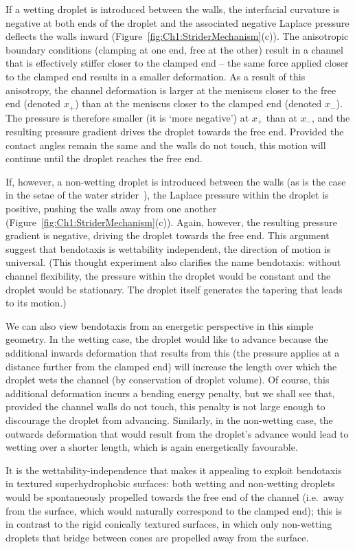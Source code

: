 If a wetting droplet is introduced between the walls, the interfacial curvature is negative at both ends of the droplet and the associated negative Laplace pressure deflects the walls inward (Figure~\ref{fig:Ch1:StriderMechanism}(c)).   The anisotropic boundary conditions (clamping at one end, free at the other) result in a channel that is effectively stiffer closer to the clamped end -- the same force applied closer to the clamped end results in a smaller deformation. As a result of this anisotropy, the channel deformation is larger at the meniscus closer to the free end (denoted $x_+$) than at the meniscus closer to the clamped end (denoted $x_-$). The pressure is therefore smaller (it is `more negative') at $x_+$ than at $x_-$, and the resulting pressure gradient drives the droplet towards the free end. Provided the contact angles remain the same and the walls do not touch, this motion will continue until the droplet reaches the free end.

If, however, a non-wetting droplet is introduced between the walls (as is the case in the setae of the water strider~\citep{Wang2015PNAS}), the Laplace pressure within the droplet is positive, pushing the walls away from one another (Figure~\ref{fig:Ch1:StriderMechanism}(c)). Again, however,  the resulting pressure gradient is negative, driving the droplet towards the free end. This argument suggest that  bendotaxis is wettability independent, the direction of motion is universal. (This thought experiment also clarifies the name bendotaxis: without channel flexibility, the pressure within the droplet would be constant and the droplet would be stationary. The droplet itself generates the tapering that leads to its motion.)

We can also view bendotaxis from an energetic perspective in this simple geometry. In the wetting case, the droplet would like to advance because the additional inwards deformation that results from this (the pressure applies at a distance further from the clamped end) will increase the length over which the droplet wets the channel (by conservation of droplet volume). Of course, this additional deformation incurs a bending energy penalty, but we shall see that, provided the channel walls do not touch, this penalty is not large enough to discourage the droplet from advancing. Similarly, in the non-wetting case, the outwards deformation that would result from the droplet's advance would lead to wetting over a shorter length, which is again energetically favourable.

It is the wettability-independence that makes it appealing to exploit bendotaxis in textured superhydrophobic surfaces: both wetting and non-wetting droplets would be spontaneously propelled towards the free end of the channel (i.e.~away from the surface, which would naturally correspond to the clamped end); this is in contrast to the rigid conically textured surfaces, in which only non-wetting droplets that bridge between cones are propelled away from the surface.


